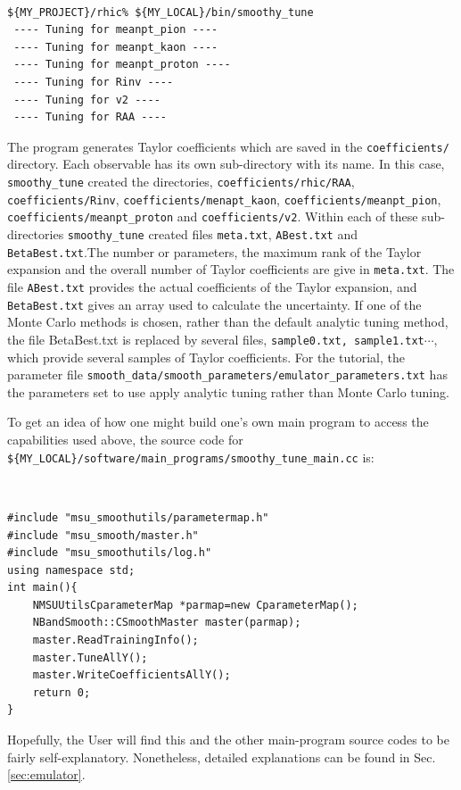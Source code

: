 \documentclass[UserManual.tex]{subfiles}
\begin{document}
{\tt
\begin{verbatim}
${MY_PROJECT}/rhic% ${MY_LOCAL}/bin/smoothy_tune
 ---- Tuning for meanpt_pion ----
 ---- Tuning for meanpt_kaon ----
 ---- Tuning for meanpt_proton ----
 ---- Tuning for Rinv ----
 ---- Tuning for v2 ----
 ---- Tuning for RAA ----
\end{verbatim}
}
The program generates Taylor coefficients which are saved in the {\tt coefficients/} directory. Each observable has its own sub-directory with its name. In this case, {\tt smoothy\_tune} created the directories, {\tt coefficients/rhic/RAA}, {\tt coefficients/Rinv}, {\tt coefficients/menapt\_kaon}, {\tt coefficients/meanpt\_pion}, {\tt coefficients/meanpt\_proton} and {\tt coefficients/v2}. Within each of these sub-directories {\tt smoothy\_tune} created files {\tt meta.txt}, {\tt ABest.txt} and {\tt BetaBest.txt}.The number or parameters, the maximum rank of the Taylor expansion and the overall number of Taylor coefficients are give in {\tt meta.txt}. The file {\tt ABest.txt} provides the actual coefficients of the Taylor expansion, and {\tt BetaBest.txt} gives an array used to calculate the uncertainty. If one of the Monte Carlo methods is chosen, rather than the default analytic tuning method, the file {BetaBest.txt} is replaced by several files, {\tt sample0.txt, sample1.txt}$\cdots$, which provide several samples of Taylor coefficients. For the tutorial, the parameter file {\tt smooth\_data/smooth\_parameters/emulator\_parameters.txt} has the parameters set to use apply analytic tuning rather than Monte Carlo tuning.

To get an idea of how one might build one's own main program to access the capabilities used above, the source code for {\tt \$\{MY\_LOCAL\}/software/main\_programs/smoothy\_tune\_main.cc} is:
{\tt
\begin{verbatim}
#include "msu_smoothutils/parametermap.h"
#include "msu_smooth/master.h"
#include "msu_smoothutils/log.h"
using namespace std;
int main(){
	NMSUUtilsCparameterMap *parmap=new CparameterMap();
	NBandSmooth::CSmoothMaster master(parmap);	
	master.ReadTrainingInfo();
	master.TuneAllY();
	master.WriteCoefficientsAllY();
	return 0;
}
\end{verbatim}}
Hopefully, the User will find this and the other main-program source codes to be fairly self-explanatory. Nonetheless, detailed explanations can be found in Sec. \ref{sec:emulator}.
\end{document}
